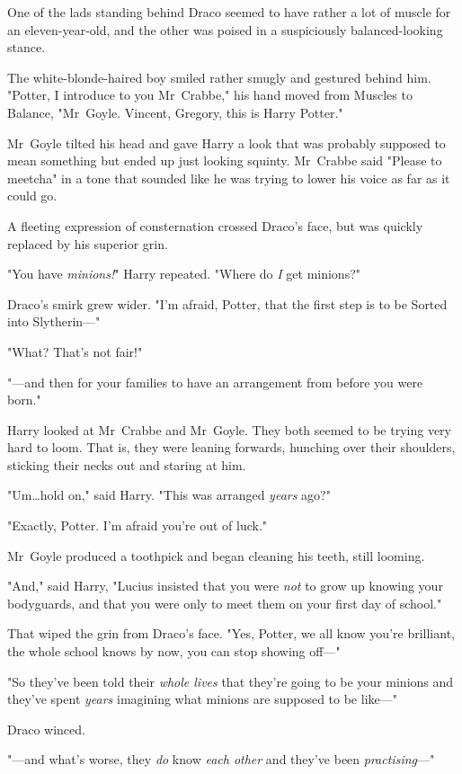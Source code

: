 One of the lads standing behind Draco seemed to have rather a lot of muscle for
an eleven-year-old, and the other was poised in a suspiciously balanced-looking
stance.

The white-blonde-haired boy smiled rather smugly and gestured behind him.
"Potter, I introduce to you Mr~Crabbe," his hand moved from Muscles to
Balance, "Mr~Goyle. Vincent, Gregory, this is Harry Potter."

Mr~Goyle tilted his head and gave Harry a look that was probably supposed to
mean something but ended up just looking squinty. Mr~Crabbe said "Please to
meetcha" in a tone that sounded like he was trying to lower his voice as far as
it could go.

A fleeting expression of consternation crossed Draco’s face, but was quickly
replaced by his superior grin.

"You have \emph{minions!}" Harry repeated. "Where do \emph{I} get minions?"

Draco’s smirk grew wider. "I’m afraid, Potter, that the first step is to be
Sorted into Slytherin—"

"What? That’s not fair!"

"—and then for your families to have an arrangement from before you were
born."

Harry looked at Mr~Crabbe and Mr~Goyle. They both seemed to be trying very
hard to loom. That is, they were leaning forwards, hunching over their
shoulders, sticking their necks out and staring at him.

"Um…hold on," said Harry. "This was arranged \emph{years} ago?"

"Exactly, Potter. I’m afraid you’re out of luck."

Mr~Goyle produced a toothpick and began cleaning his teeth, still looming.

"And," said Harry, "Lucius insisted that you were \emph{not} to grow up knowing
your bodyguards, and that you were only to meet them on your first day of
school."

That wiped the grin from Draco’s face. "Yes, Potter, we all know you’re
brilliant, the whole school knows by now, you can stop showing off—"

"So they’ve been told their \emph{whole lives} that they’re going to be your
minions and they’ve spent \emph{years} imagining what minions are supposed to
be like—"

Draco winced.

"—and what’s worse, they \emph{do} know \emph{each other} and they’ve been
\emph{practising}—"

